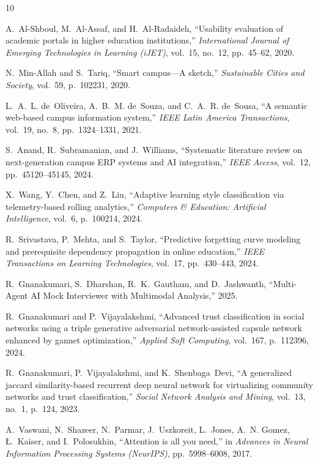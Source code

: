 \documentclass[conference]{IEEEtran}
\begin{document}
\begin{thebibliography}{10}

A.~Al-Shboul, M.~Al-Assaf, and H.~Al-Radaideh, ``Usability evaluation of academic portals in higher education institutions,'' {\em International Journal of Emerging Technologies in Learning (iJET)}, vol.~15, no.~12, pp.~45--62, 2020.

N.~Min-Allah and S.~Tariq, ``Smart campus---A sketch,'' {\em Sustainable Cities and Society}, vol.~59, p.~102231, 2020.

L.~A.~L. de~Oliveira, A.~B.~M. de~Souza, and C.~A.~R. de~Sousa, ``A semantic web-based campus information system,'' {\em IEEE Latin America Transactions}, vol.~19, no.~8, pp.~1324--1331, 2021.

S.~Anand, R.~Subramanian, and J.~Williams, ``Systematic literature review on next-generation campus ERP systems and AI integration,'' {\em IEEE Access}, vol.~12, pp.~45120--45145, 2024.

X.~Wang, Y.~Chen, and Z.~Liu, ``Adaptive learning style classification via telemetry-based rolling analytics,'' {\em Computers \& Education: Artificial Intelligence}, vol.~6, p.~100214, 2024.

R.~Srivastava, P.~Mehta, and S.~Taylor, ``Predictive forgetting curve modeling and prerequisite dependency propagation in online education,'' {\em IEEE Transactions on Learning Technologies}, vol.~17, pp.~430--443, 2024.

R.~Gnanakumari, S.~Dharshan, R.~K.~Gautham, and D.~Jashwanth, ``Multi-Agent AI Mock Interviewer with Multimodal Analysis,'' 2025.

R.~Gnanakumari and P.~Vijayalakshmi, ``Advanced trust classification in social networks using a triple generative adversarial network-assisted capsule network enhanced by gannet optimization,'' {\em Applied Soft Computing}, vol.~167, p.~112396, 2024.

R.~Gnanakumari, P.~Vijayalakshmi, and K.~Shenbaga~Devi, ``A generalized jaccard similarity-based recurrent deep neural network for virtualizing community networks and trust classification,'' {\em Social Network Analysis and Mining}, vol.~13, no.~1, p.~124, 2023.

A.~Vaswani, N.~Shazeer, N.~Parmar, J.~Uszkoreit, L.~Jones, A.~N. Gomez, {\L}.~Kaiser, and I.~Polosukhin, ``Attention is all you need,'' in {\em Advances in Neural Information Processing Systems (NeurIPS)}, pp.~5998--6008, 2017.


\end{thebibliography}
\end{document}
